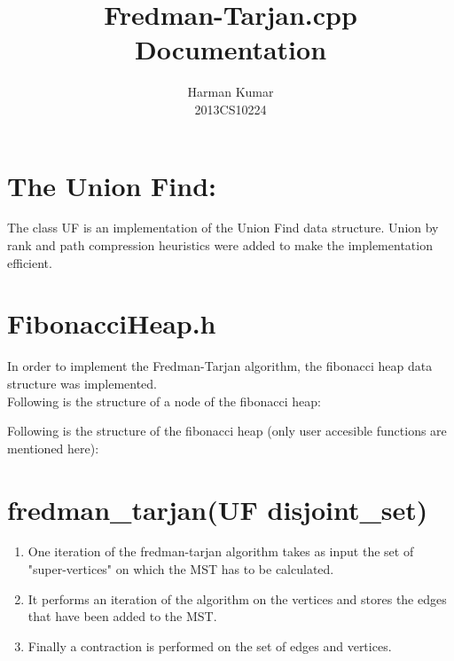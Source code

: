 \documentclass[]{article}
\begin{document}
\author{
		Harman Kumar\\
		2013CS10224		
		}

\title{Fredman-Tarjan.cpp Documentation}
\maketitle


\section{The Union Find:}

\begin{flushleft}

The class UF is an implementation of the Union Find data structure. Union by rank and path compression heuristics were added to make the implementation efficient.
		
	\vspace{10px}	

\end{flushleft} 


\section{FibonacciHeap.h}
\begin{flushleft}
	In order to implement the Fredman-Tarjan algorithm, the fibonacci heap data structure was implemented.\\
	Following is the structure of a node of the fibonacci heap:
	
		

	Following is the structure of the fibonacci heap (only user accesible functions are mentioned here):	

		
	\vspace{10px}	
	
\end{flushleft} 

\section{fredman\_tarjan(UF disjoint\_set)}
\begin{flushleft}
\begin{enumerate}

	\item One iteration of the fredman-tarjan algorithm takes as input the set of "super-vertices" on which the MST has to be calculated.\\
	
	\item It performs an iteration of the algorithm on the vertices and stores the edges that have been added to the MST.
	
	\item Finally a contraction is performed on the set of edges and vertices. 

\end{enumerate}	
\end{flushleft}
\end{document}
